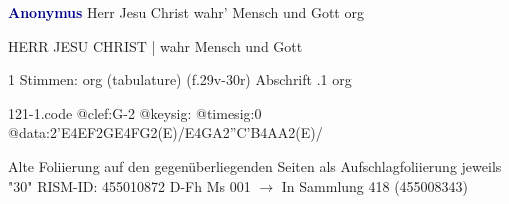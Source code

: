 \documentclass[twocolumn]{book}
\begin{document}
\newline \par \vspace{7pt} \textcolor{darkblue}{\textbf{Anonymus  }}
\newline Herr Jesu Christ wahr' Mensch und Gott
\newline org
\newline \begin{itshape}[f.29v, at left:] HERR JESU CHRIST | wahr Mensch und Gott\end{itshape} 
\newline \textcolor{darkblue}{}  1 Stimmen: org (tabulature)  (f.29v-30r)
\newline Abschrift
.1  org  
\begin{filecontents*}{121-1.code}
@clef:G-2
@keysig:
@timesig:0
@data:2'E4EF2GE4FG2(E)/E4GA2''C'B4AA2(E)/
\end{filecontents*}
\newline
%
\newline Alte Foliierung auf den gegenüberliegenden Seiten als Aufschlagfoliierung jeweils "30"
\newline RISM-ID: 455010872
\newline D-Fh  Ms 001
\newline $\rightarrow$ In Sammlung 418 (455008343)
      
\end{document}
